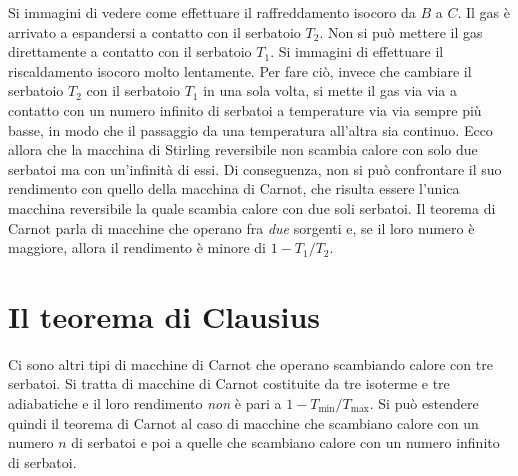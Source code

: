 \begin{figure}[htpb]
\end{figure}
\FloatBarrier
Si immagini di vedere come effettuare il raffreddamento isocoro da $B$ a $C$. Il gas è arrivato a espandersi a contatto con il serbatoio $T_2$. Non si può mettere il gas direttamente a contatto con il serbatoio $T_1$. Si immagini di effettuare il riscaldamento isocoro molto lentamente. Per fare ciò, invece che cambiare il serbatoio $T_2$ con il serbatoio $T_1$ in una sola volta, si mette il gas via via a contatto con un numero infinito di serbatoi a temperature via via sempre più basse, in modo che il passaggio da una temperatura all'altra sia continuo. Ecco allora che la macchina di Stirling reversibile non scambia calore con solo due serbatoi ma con un'infinità di essi. Di conseguenza, non si può confrontare il suo rendimento con quello della macchina di Carnot, che risulta essere l'unica macchina reversibile la quale scambia calore con due soli serbatoi. Il teorema di Carnot parla di macchine che operano fra \emph{due} sorgenti e, se il loro numero è maggiore, allora il rendimento è minore di $1-T_1/T_2$.

\section{Il teorema di Clausius}

Ci sono altri tipi di macchine di Carnot che operano scambiando calore con tre serbatoi. Si tratta di macchine di Carnot costituite da tre isoterme e tre adiabatiche e il loro rendimento \emph{non} è pari a $1-T_\text{min}/T_\text{max}$. Si può estendere quindi il teorema di Carnot al caso di macchine che scambiano calore con un numero $n$ di serbatoi e poi a quelle che scambiano calore con un numero infinito di serbatoi.

